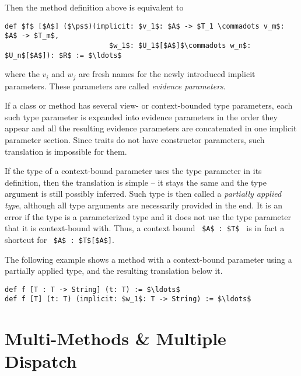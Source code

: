 Then the method definition above is equivalent to
\begin{lstlisting}
def $f$ [$A$] ($\ps$)(implicit: $v_1$: $A$ -> $T_1 \commadots v_m$: $A$ -> $T_m$,
                         $w_1$: $U_1$[$A$]$\commadots w_n$: $U_n$[$A$]): $R$ := $\ldots$
\end{lstlisting}
where the $v_i$ and $w_j$ are fresh names for the newly introduced implicit parameters. These parameters are called {\em evidence parameters}. 

If a class or method has several view- or context-bounded type parameters, each such type parameter is expanded into evidence parameters in the order they appear and all the resulting evidence parameters are concatenated in one implicit parameter section. Since traits do not have constructor parameters, such translation is impossible for them. 

If the type of a context-bound parameter uses the type parameter in its definition, then the translation is simple -- it stays the same and the type argument is still possibly inferred. Such type is then called a {\em partially applied type}, although all type arguments are necessarily provided in the end. It is an error if the type is a parameterized type and it does not use the type parameter that it is context-bound with. Thus, a context bound ~\lstinline!$A$ : $T$!~ is in fact a shortcut for ~\lstinline!$A$ : $T$[$A$]!. 

\example The following example shows a method with a context-bound parameter using a partially applied type, and the resulting translation below it. 
\begin{lstlisting}
def f [T : T -> String] (t: T) := $\ldots$
def f [T] (t: T) (implicit: $w_1$: T -> String) := $\ldots$
\end{lstlisting}





\section{Multi-Methods \& Multiple Dispatch}
\label{sec:multi-methods}


